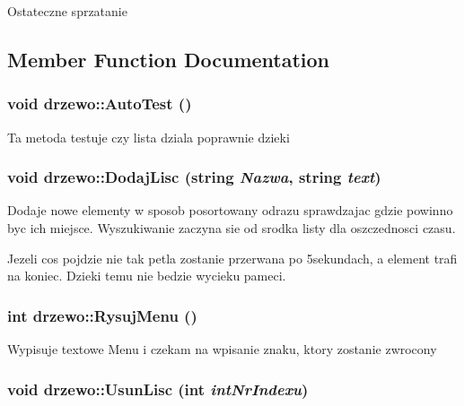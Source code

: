 Ostateczne sprzatanie 

\subsection{Member Function Documentation}
\hypertarget{classdrzewo_a69c8619ac7339ce26f1c092c918c42dc}{
\subsubsection[{AutoTest}]{\setlength{\rightskip}{0pt plus 5cm}void drzewo::AutoTest ()}}
\label{classdrzewo_a69c8619ac7339ce26f1c092c918c42dc}


Ta metoda testuje czy lista dziala poprawnie dzieki\hypertarget{classdrzewo_affe40fef12dfebfca7e1b46a73bdbb8d}{
\subsubsection[{DodajLisc}]{\setlength{\rightskip}{0pt plus 5cm}void drzewo::DodajLisc (string {\em Nazwa}, \/  string {\em text})}}
\label{classdrzewo_affe40fef12dfebfca7e1b46a73bdbb8d}


Dodaje nowe elementy w sposob posortowany odrazu sprawdzajac gdzie powinno byc ich miejsce. Wyszukiwanie zaczyna sie od srodka listy dla oszczednosci czasu.

Jezeli cos pojdzie nie tak petla zostanie przerwana po 5sekundach, a element trafi na koniec. Dzieki temu nie bedzie wycieku pameci. \hypertarget{classdrzewo_af129795d6fd7898310227906056f6d41}{
\subsubsection[{RysujMenu}]{\setlength{\rightskip}{0pt plus 5cm}int drzewo::RysujMenu ()}}
\label{classdrzewo_af129795d6fd7898310227906056f6d41}


Wypisuje textowe Menu i czekam na wpisanie znaku, ktory zostanie zwrocony\hypertarget{classdrzewo_a01f1a0204f7353311e2015d18347e383}{
\subsubsection[{UsunLisc}]{\setlength{\rightskip}{0pt plus 5cm}void drzewo::UsunLisc (int {\em intNrIndexu})}}
\label{classdrzewo_a01f1a0204f7353311e2015d18347e383}


